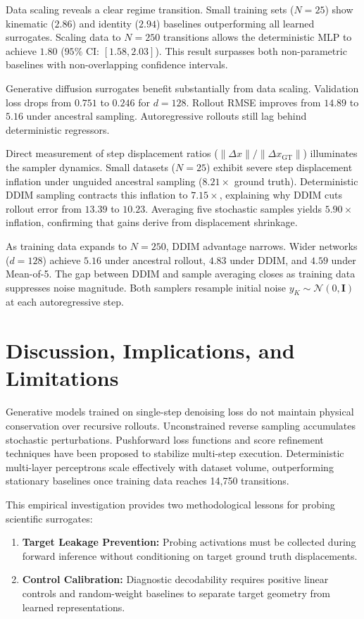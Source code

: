 \documentclass[11pt,a4paper]{article}
\begin{document}
Data scaling reveals a clear regime transition. Small training sets ($N=25$) show kinematic ($2.86$) and identity ($2.94$) baselines outperforming all learned surrogates. Scaling data to $N=250$ transitions allows the deterministic MLP to achieve $1.80$ ($95\%$ CI: $[1.58, 2.03]$). This result surpasses both non-parametric baselines with non-overlapping confidence intervals.

Generative diffusion surrogates benefit substantially from data scaling. Validation loss drops from $0.751$ to $0.246$ for $d=128$. Rollout RMSE improves from $14.89$ to $5.16$ under ancestral sampling. Autoregressive rollouts still lag behind deterministic regressors.

Direct measurement of step displacement ratios ($\|\Delta \hat{x}\| / \|\Delta x_{\mathrm{GT}}\|$) illuminates the sampler dynamics. Small datasets ($N=25$) exhibit severe step displacement inflation under unguided ancestral sampling ($8.21\times$ ground truth). Deterministic DDIM sampling contracts this inflation to $7.15\times$, explaining why DDIM cuts rollout error from $13.39$ to $10.23$. Averaging five stochastic samples yields $5.90\times$ inflation, confirming that gains derive from displacement shrinkage.

As training data expands to $N=250$, DDIM advantage narrows. Wider networks ($d=128$) achieve $5.16$ under ancestral rollout, $4.83$ under DDIM, and $4.59$ under Mean-of-5. The gap between DDIM and sample averaging closes as training data suppresses noise magnitude. Both samplers resample initial noise $y_K \sim \mathcal{N}(0, \mathbf{I})$ at each autoregressive step.

\section{Discussion, Implications, and Limitations}

Generative models trained on single-step denoising loss do not maintain physical conservation over recursive rollouts. Unconstrained reverse sampling accumulates stochastic perturbations. Pushforward loss functions \cite{brandstetter2022message} and score refinement techniques \cite{LippeVPTB23} have been proposed to stabilize multi-step execution. Deterministic multi-layer perceptrons scale effectively with dataset volume, outperforming stationary baselines once training data reaches 14,750 transitions.

This empirical investigation provides two methodological lessons for probing scientific surrogates:
\begin{enumerate}
    \item \textbf{Target Leakage Prevention:} Probing activations must be collected during forward inference without conditioning on target ground truth displacements.
    \item \textbf{Control Calibration:} Diagnostic decodability requires positive linear controls and random-weight baselines to separate target geometry from learned representations.
\end{enumerate}
\end{document}
